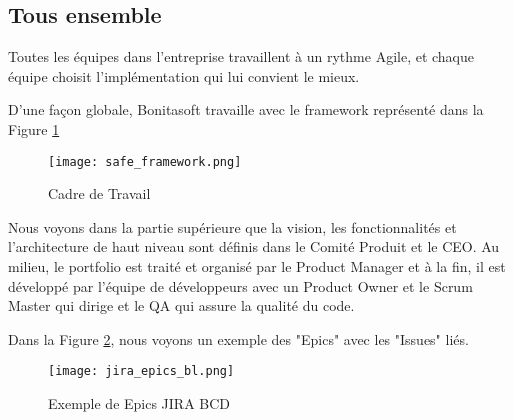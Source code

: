 \subsection{Tous ensemble}

Toutes les équipes dans l'entreprise travaillent à un rythme Agile, et chaque équipe choisit l'implémentation qui lui convient le mieux.

D'une façon globale, Bonitasoft travaille avec le framework représenté dans la Figure \ref{frame_safe}

\begin{figure}[!ht]
\centering
\texttt{[image: safe\_framework.png]}
\caption{Cadre de Travail \cite{safe}}
\label{frame_safe}
\end{figure}

Nous voyons dans la partie supérieure que la vision, les fonctionnalités et l'architecture de haut niveau sont définis dans le Comité Produit et le CEO.
Au milieu, le portfolio est traité et organisé par le Product Manager et à la fin, il est développé par l'équipe de développeurs avec un Product Owner et le Scrum Master qui dirige et le QA qui assure la qualité du code.

Dans la Figure \ref{fig:example_epic}, nous voyons un exemple des "Epics" avec les "Issues" liés.
\begin{figure}[!ht]
\centering
\texttt{[image: jira\_epics\_bl.png]}
\caption{Exemple de Epics JIRA BCD}
\label{fig:example_epic}
\end{figure}
